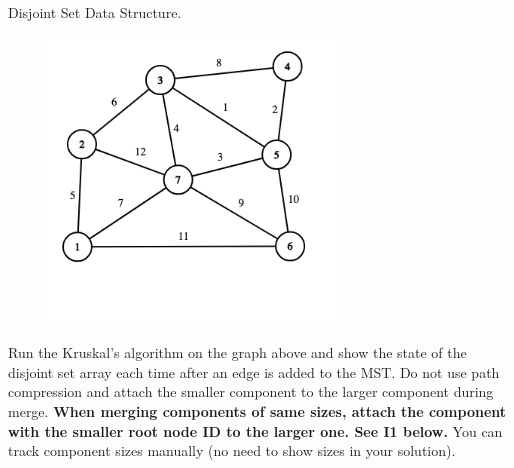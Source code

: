 \documentclass[12pt]{exam}
\newcommand{\stars}[1]{%
    \foreach \n in {1,...,#1}{%
        $\filledstar$%
    }%
}
\begin{document}
\begin{questions}
    \clearpage

    \question[10] [W5, \stars{1}] Disjoint Set Data Structure.

    \vspace*{-0.2cm}
    \begin{figure}[h]
        \center
        \includegraphics[width = 3in]{hw4-q3.png}
    \end{figure}

    \vspace*{-1.5cm}

    Run the Kruskal's algorithm on the graph above and show the state of the disjoint set array each time after an edge is added to the MST. Do not use path compression and attach the smaller component to the larger component during merge. {\bf When merging components of same sizes, attach the component with the smaller root node ID to the larger one. See I1 below.} You can track component sizes manually (no need to show sizes in your solution).


\end{questions}
\end{document}
